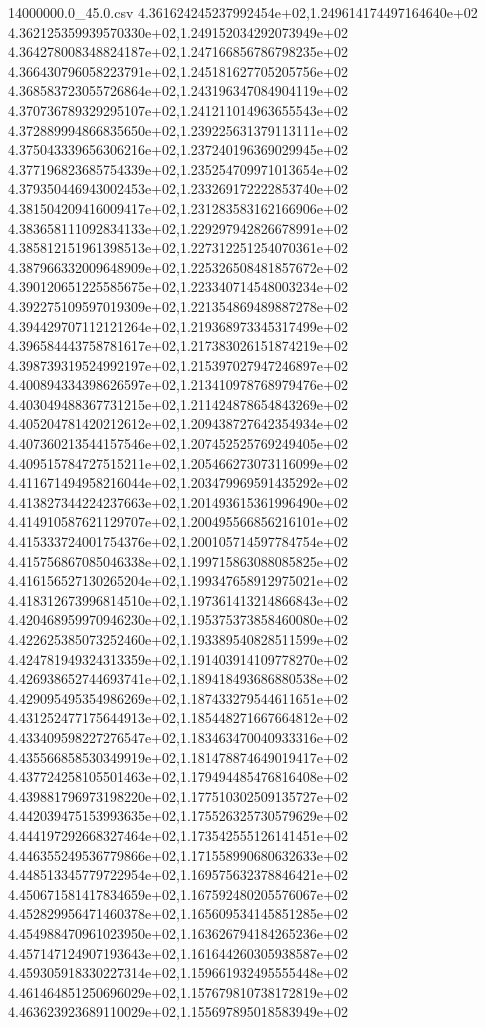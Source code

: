 \begin{filecontents*}{14000000.0_45.0.csv}
4.361624245237992454e+02,1.249614174497164640e+02
4.362125359939570330e+02,1.249152034292073949e+02
4.364278008348824187e+02,1.247166856786798235e+02
4.366430796058223791e+02,1.245181627705205756e+02
4.368583723055726864e+02,1.243196347084904119e+02
4.370736789329295107e+02,1.241211014963655543e+02
4.372889994866835650e+02,1.239225631379113111e+02
4.375043339656306216e+02,1.237240196369029945e+02
4.377196823685754339e+02,1.235254709971013654e+02
4.379350446943002453e+02,1.233269172222853740e+02
4.381504209416009417e+02,1.231283583162166906e+02
4.383658111092834133e+02,1.229297942826678991e+02
4.385812151961398513e+02,1.227312251254070361e+02
4.387966332009648909e+02,1.225326508481857672e+02
4.390120651225585675e+02,1.223340714548003234e+02
4.392275109597019309e+02,1.221354869489887278e+02
4.394429707112121264e+02,1.219368973345317499e+02
4.396584443758781617e+02,1.217383026151874219e+02
4.398739319524992197e+02,1.215397027947246897e+02
4.400894334398626597e+02,1.213410978768979476e+02
4.403049488367731215e+02,1.211424878654843269e+02
4.405204781420212612e+02,1.209438727642354934e+02
4.407360213544157546e+02,1.207452525769249405e+02
4.409515784727515211e+02,1.205466273073116099e+02
4.411671494958216044e+02,1.203479969591435292e+02
4.413827344224237663e+02,1.201493615361996490e+02
4.414910587621129707e+02,1.200495566856216101e+02
4.415333724001754376e+02,1.200105714597784754e+02
4.415756867085046338e+02,1.199715863088085825e+02
4.416156527130265204e+02,1.199347658912975021e+02
4.418312673996814510e+02,1.197361413214866843e+02
4.420468959970946230e+02,1.195375373858460080e+02
4.422625385073252460e+02,1.193389540828511599e+02
4.424781949324313359e+02,1.191403914109778270e+02
4.426938652744693741e+02,1.189418493686880538e+02
4.429095495354986269e+02,1.187433279544611651e+02
4.431252477175644913e+02,1.185448271667664812e+02
4.433409598227276547e+02,1.183463470040933316e+02
4.435566858530349919e+02,1.181478874649019417e+02
4.437724258105501463e+02,1.179494485476816408e+02
4.439881796973198220e+02,1.177510302509135727e+02
4.442039475153993635e+02,1.175526325730579629e+02
4.444197292668327464e+02,1.173542555126141451e+02
4.446355249536779866e+02,1.171558990680632633e+02
4.448513345779722954e+02,1.169575632378846421e+02
4.450671581417834659e+02,1.167592480205576067e+02
4.452829956471460378e+02,1.165609534145851285e+02
4.454988470961023950e+02,1.163626794184265236e+02
4.457147124907193643e+02,1.161644260305938587e+02
4.459305918330227314e+02,1.159661932495555448e+02
4.461464851250696029e+02,1.157679810738172819e+02
4.463623923689110029e+02,1.155697895018583949e+02

\end{filecontents*}
